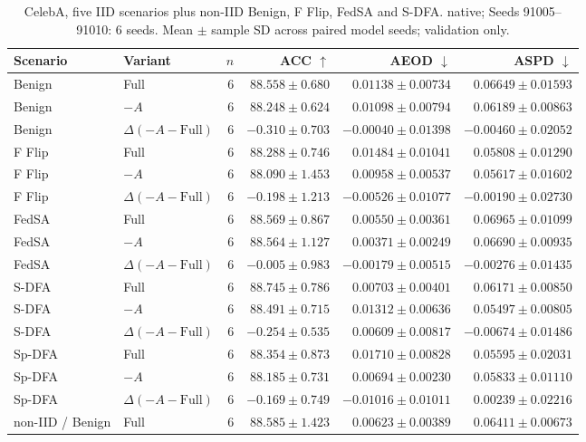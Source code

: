 \begin{table}[t]
\centering
\small
\caption{CelebA, five IID scenarios plus non-IID Benign, F Flip, FedSA and S-DFA. native; Seeds 91005–91010: 6 seeds. Mean $\pm$ sample SD across paired model seeds; validation only.}
\begin{tabular}{llrrrr}
\toprule
Scenario & Variant & $n$ & ACC $\uparrow$ & AEOD $\downarrow$ & ASPD $\downarrow$ \\
\midrule
Benign & Full & 6 & $88.558 \pm 0.680$ & $0.01138 \pm 0.00734$ & $0.06649 \pm 0.01593$ \\
Benign & $-A$ & 6 & $88.248 \pm 0.624$ & $0.01098 \pm 0.00794$ & $0.06189 \pm 0.00863$ \\
Benign & $\Delta(-A-\mathrm{Full})$ & 6 & $-0.310 \pm 0.703$ & $-0.00040 \pm 0.01398$ & $-0.00460 \pm 0.02052$ \\
F Flip & Full & 6 & $88.288 \pm 0.746$ & $0.01484 \pm 0.01041$ & $0.05808 \pm 0.01290$ \\
F Flip & $-A$ & 6 & $88.090 \pm 1.453$ & $0.00958 \pm 0.00537$ & $0.05617 \pm 0.01602$ \\
F Flip & $\Delta(-A-\mathrm{Full})$ & 6 & $-0.198 \pm 1.213$ & $-0.00526 \pm 0.01077$ & $-0.00190 \pm 0.02730$ \\
FedSA & Full & 6 & $88.569 \pm 0.867$ & $0.00550 \pm 0.00361$ & $0.06965 \pm 0.01099$ \\
FedSA & $-A$ & 6 & $88.564 \pm 1.127$ & $0.00371 \pm 0.00249$ & $0.06690 \pm 0.00935$ \\
FedSA & $\Delta(-A-\mathrm{Full})$ & 6 & $-0.005 \pm 0.983$ & $-0.00179 \pm 0.00515$ & $-0.00276 \pm 0.01435$ \\
S-DFA & Full & 6 & $88.745 \pm 0.786$ & $0.00703 \pm 0.00401$ & $0.06171 \pm 0.00850$ \\
S-DFA & $-A$ & 6 & $88.491 \pm 0.715$ & $0.01312 \pm 0.00636$ & $0.05497 \pm 0.00805$ \\
S-DFA & $\Delta(-A-\mathrm{Full})$ & 6 & $-0.254 \pm 0.535$ & $0.00609 \pm 0.00817$ & $-0.00674 \pm 0.01486$ \\
Sp-DFA & Full & 6 & $88.354 \pm 0.873$ & $0.01710 \pm 0.00828$ & $0.05595 \pm 0.02031$ \\
Sp-DFA & $-A$ & 6 & $88.185 \pm 0.731$ & $0.00694 \pm 0.00230$ & $0.05833 \pm 0.01110$ \\
Sp-DFA & $\Delta(-A-\mathrm{Full})$ & 6 & $-0.169 \pm 0.749$ & $-0.01016 \pm 0.01011$ & $0.00239 \pm 0.02216$ \\
non-IID / Benign & Full & 6 & $88.585 \pm 1.423$ & $0.00623 \pm 0.00389$ & $0.06411 \pm 0.00673$ \\

\end{tabular}
\end{table}
